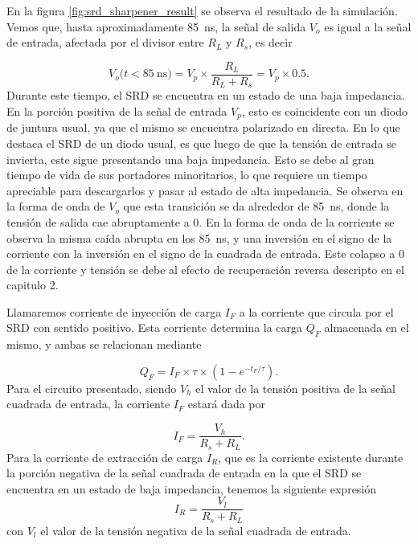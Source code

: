En la figura \ref{fig:srd_sharpener_result} se observa el resultado de la
simulación. Vemos que, hasta aproximadamente \qty{85}{\nano\second}, la señal de
salida $V_o$ es igual a la señal de entrada, afectada por el divisor entre $R_L$
y $R_s$, es decir

\begin{equation}
    V_o(t < \qty{85}{\nano\second)} = V_p \times \frac{R_L}{R_L+R_s} = V_p
    \times 0.5.
\end{equation}
Durante este tiempo, el SRD se encuentra en un estado de una baja impedancia. En
la porción positiva de la señal de entrada $V_p$, esto es coincidente con un
diodo de juntura usual, ya que el mismo se encuentra polarizado en directa. En
lo que destaca el SRD de un diodo usual, es que luego de que la tensión de
entrada se invierta, este sigue presentando una baja impedancia. Esto se debe al
gran tiempo de vida de sus portadores minoritarios, lo que requiere un tiempo
apreciable para descargarlos y pasar al estado de alta impedancia. Se observa en
la forma de onda de $V_o$ que esta transición se da alrededor de
\qty{85}{\nano\second}, donde la tensión de salida cae abruptamente a $0$. En la
forma de onda de la corriente se observa la misma caída abrupta en los
\qty{85}{\nano\second}, y una inversión en el signo de la corriente con la
inversión en el signo de la cuadrada de entrada. Este colapso a $0$ de la
corriente y tensión se debe al efecto de recuperación reversa descripto en el
capitulo 2.

Llamaremos corriente de inyección de carga $I_F$ a la corriente que circula por
el SRD con sentido positivo. Esta corriente determina la carga
$Q_F$ almacenada en el mismo, y ambas se relacionan mediante \cite{an918}
\cite{moll1969}

\begin{equation}
    Q_F = I_F \times \tau \times \left( 1 - e^{-t_F/\tau}\right).
\end{equation}
Para el circuito presentado, siendo $V_h$ el valor de la tensión positiva de
la señal cuadrada de entrada, la corriente $I_F$ estará dada por

\begin{equation}
    I_{F} = \frac{V_h}{R_s+R_L}.
\end{equation}
Para la corriente de extracción de carga $I_R$, que es la corriente existente
durante la porción negativa de la señal cuadrada de entrada en la que el
SRD se encuentra en un estado de baja impedancia, tenemos la siguiente
expresión
\begin{equation}
    I_{R} = \frac{V_l}{R_s+R_L}
\end{equation}
con $V_l$ el valor de la tensión negativa de la señal cuadrada de entrada.

